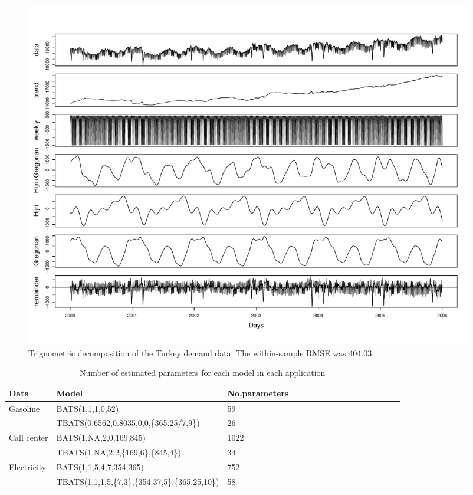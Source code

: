\documentclass{uwstat572}
\begin{document}
\begin{figure}[]
\centering
  \includegraphics[width=\linewidth,height=6in]{tbatsDecompTelec.pdf}
  \caption{Trignometric decomposition of the Turkey demand data. The within-sample RMSE was 404.03.}
  \label{fig:tbatsDecompTelec}
\end{figure}

\begin{table}[]
\small
\centering
\caption{Number of estimated parameters for each model in each application}
\label{table:number}
\begin{tabular}{l l l l l l l l l l l l l l l l}
\hline \hline
Data & Model & No.parameters \\ \hline
Gasoline & BATS(1,1,1,0,52) & 59 \\
 & TBATS(0.6562,0.8035,0,0,\{365.25/7,9\}) & 26 \\
 Call center & BATS(1,NA,2,0,169,845) & 1022  \\
  & TBATS(1,NA,2,2,\{169,6\},\{845,4\}) & 34  \\
 Electricity & BATS(1,1,5,4,7,354,365) & 752  \\
  & TBATS(1,1,1,5,\{7,3\},\{354.37,5\},\{365.25,10\}) & 58  \\ \hline
\end{tabular}
\end{table}




\clearpage
\newpage

\end{document}
